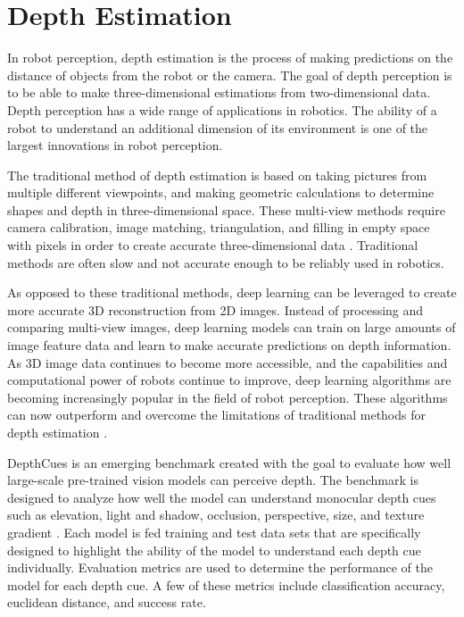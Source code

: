\documentclass[conference]{IEEEtran}
\begin{document}
\section{Depth Estimation}
In robot perception, depth estimation is the process of making predictions on the distance of objects from the robot or the camera. The goal of depth perception is to be able to make three-dimensional estimations from two-dimensional data. Depth perception has a wide range of applications in robotics. The ability of a robot to understand an additional dimension of its environment is one of the largest innovations in robot perception.
\par
The traditional method of depth estimation is based on taking pictures from multiple different viewpoints, and making geometric calculations to determine shapes and depth in three-dimensional space. These multi-view methods require camera calibration, image matching, triangulation, and filling in empty space with pixels in order to create accurate three-dimensional data \cite{wang2023}. Traditional methods are often slow and not accurate enough to be reliably used in robotics.
\par
As opposed to these traditional methods, deep learning can be leveraged to create more accurate 3D reconstruction from 2D images. Instead of processing and comparing multi-view images, deep learning models can train on large amounts of image feature data and learn to make accurate predictions on depth information. As 3D image data continues to become more accessible, and the capabilities and computational power of robots continue to improve, deep learning algorithms are becoming increasingly popular in the field of robot perception. These algorithms can now outperform and overcome the limitations of traditional methods for depth estimation \cite{wang2023}.
\par
DepthCues is an emerging benchmark created with the goal to evaluate how well large-scale pre-trained vision models can perceive depth. The benchmark is designed to analyze how well the model can understand monocular depth cues such as  elevation, light and shadow, occlusion, perspective, size, and texture gradient \cite{danier2025}. Each model is fed training and test data sets that are specifically designed to highlight the ability of the model to understand each depth cue individually. Evaluation metrics are used to determine the performance of the model for each depth cue. A few of these metrics include classification accuracy, euclidean distance, and success rate.
\par
\end{document}

